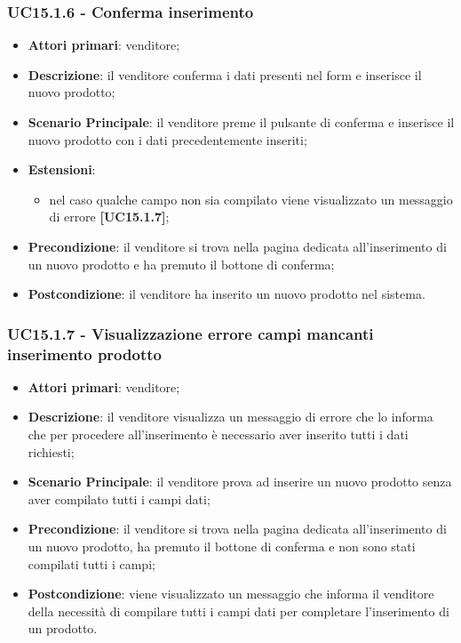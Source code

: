 \subsubsection{UC15.1.6 - Conferma inserimento}
\begin{itemize}
\item \textbf{Attori primari}: venditore;
\item \textbf{Descrizione}: il venditore conferma i dati presenti nel form e inserisce il nuovo prodotto;
\item \textbf{Scenario Principale}: il venditore preme il pulsante di conferma e inserisce il nuovo prodotto con i dati precedentemente inseriti;
\item \textbf{Estensioni}: 
\begin{itemize}
\item nel caso qualche campo non sia compilato viene visualizzato un messaggio di errore \textbf{[UC15.1.7]};
\end{itemize} 
\item \textbf{Precondizione}: il venditore si trova nella pagina dedicata all'inserimento di un nuovo prodotto e ha premuto il bottone di conferma;
\item \textbf{Postcondizione}: il venditore ha inserito un nuovo prodotto nel sistema.
\end{itemize}

\subsubsection{UC15.1.7 - Visualizzazione errore campi mancanti inserimento prodotto}
\begin{itemize}
\item \textbf{Attori primari}: venditore;
\item \textbf{Descrizione}: il venditore visualizza un messaggio di errore che lo informa che per procedere all'inserimento è necessario aver inserito tutti i dati richiesti;
\item \textbf{Scenario Principale}: il venditore prova ad inserire un nuovo prodotto senza aver compilato tutti i campi dati;
\item \textbf{Precondizione}: il venditore si trova nella pagina dedicata all'inserimento di un nuovo prodotto, ha premuto il bottone di conferma e non sono stati compilati tutti i campi;
\item \textbf{Postcondizione}: viene visualizzato un messaggio che informa il venditore della necessità di compilare tutti i campi dati per completare l'inserimento di un prodotto.
\end{itemize}

